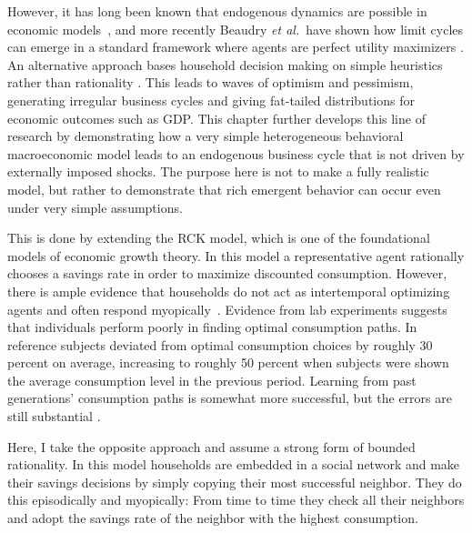 However, it has long been known that endogenous dynamics are possible in economic models~\cite{day1983emergence,BOLDRIN198626, Scheinkman, boldrin1992equilibrium, boldrin1992sources,blume1992evolution}, and more recently Beaudry \textit{et al.}\ have shown how limit cycles can emerge in a standard framework where agents are perfect utility maximizers \cite{beaudry2015reviving, beaudry2016putting}.  An alternative approach bases household decision making on simple heuristics rather than rationality \cite{DeGrauwe2011,DeGrauwe2010the}.  This leads to waves of optimism and pessimism, generating irregular business cycles and giving fat-tailed distributions for economic outcomes such as GDP. This chapter further develops this line of research by demonstrating how a very simple heterogeneous behavioral macroeconomic model leads to an endogenous business cycle that is not driven by externally imposed shocks. The purpose here is not to make a fully realistic model, but rather to demonstrate that rich emergent behavior can occur even under very simple assumptions.

This is done by extending the RCK model, which is one of the foundational models of economic growth theory. In this model a representative agent rationally chooses a savings rate in order to maximize discounted consumption.  However, there is ample evidence that households do not act as intertemporal optimizing agents and often respond myopically~\cite{Benartzi1995,Loewenstein2000,Choi2016}.  Evidence from lab experiments suggests that individuals perform poorly in finding optimal consumption paths. In reference \cite{carbone2014lifecycle} subjects deviated from optimal consumption choices by roughly 30 percent on average, increasing to roughly 50 percent when subjects were shown the average consumption level in the previous period.  Learning from past generations' consumption paths is somewhat more successful, but the errors are still substantial \cite{ballinger2003precautionary,brown2009learning}.  

Here, I take the opposite approach and assume a strong form of bounded rationality.  In this model households are embedded in a social network and make their savings decisions by simply copying their most successful neighbor. They do this episodically and myopically: From time to time they check all their neighbors and adopt the savings rate of the neighbor with the highest consumption.   

